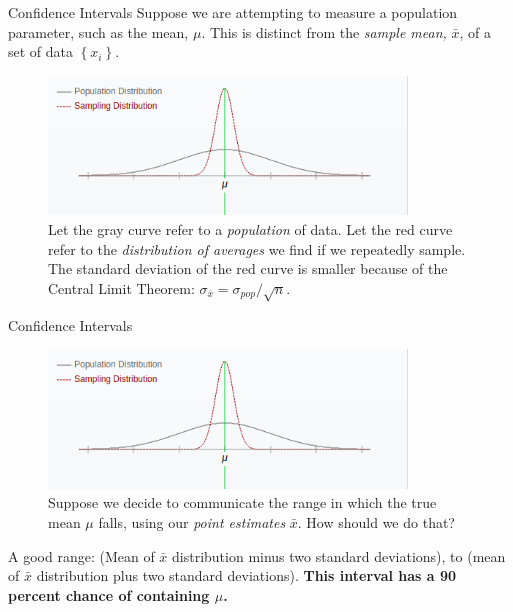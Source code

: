 \documentclass{beamer}
\begin{document}
\begin{frame}{Confidence Intervals}
Suppose we are attempting to measure a population parameter, such as the mean, $\mu$.  This is distinct from the \textit{sample mean,} $\bar{x}$, of a set of data $\left \lbrace x_i \right \rbrace$.
\begin{figure}
\centering
\includegraphics[width=0.85\textwidth]{figures/samples.png}
\caption{\label{fig:samp} Let the gray curve refer to a \textit{population} of data.  Let the red curve refer to the \textit{distribution of averages} we find if we repeatedly sample.  The standard deviation of the red curve is smaller because of the Central Limit Theorem: $\sigma_{\bar{x}} = \sigma_{pop}/\sqrt{n}$.}
\end{figure}
\end{frame}

\begin{frame}{Confidence Intervals}
\begin{figure}
\centering
\includegraphics[width=0.85\textwidth]{figures/samples.png}
\caption{\label{fig:samp2} Suppose we decide to communicate the range in which the true mean $\mu$ falls, using our \textit{point estimates} $\bar{x}$.  How should we do that?}
\end{figure}

A good range: (Mean of $\bar{x}$ distribution minus two standard deviations), to (mean of $\bar{x}$ distribution plus two standard deviations).  \textbf{\alert{This interval has a 90 percent chance of containing $\mu$.}}
\end{frame}
\end{document}
